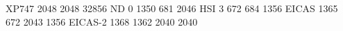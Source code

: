 XP747 2048 2048 32856
ND          0 1350  681 2046
HSI         3  672  684 1356
EICAS    1365  672 2043 1356
EICAS-2  1368 1362 2040 2040
